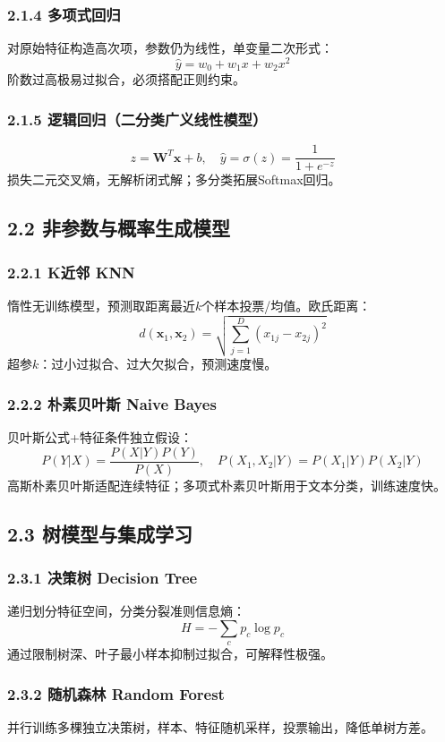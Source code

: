 \documentclass[11pt,a4paper]{article}
\begin{document}
\subsubsection{2.1.4 多项式回归}
对原始特征构造高次项，参数仍为线性，单变量二次形式：
\[
\hat{y}=w_0 + w_1 x + w_2 x^2
\]
阶数过高极易过拟合，必须搭配正则约束。

\subsubsection{2.1.5 逻辑回归（二分类广义线性模型）}
\[
z=\boldsymbol{W}^T \boldsymbol{x}+b,\quad \hat{y}=\sigma(z)=\frac{1}{1+e^{-z}}
\]
损失二元交叉熵，无解析闭式解；多分类拓展Softmax回归。

\subsection{2.2 非参数与概率生成模型}
\subsubsection{2.2.1 K近邻 KNN}
惰性无训练模型，预测取距离最近$k$个样本投票/均值。欧氏距离：
\[
d(\boldsymbol{x}_1,\boldsymbol{x}_2)=\sqrt{\sum_{j=1}^D (x_{1j}-x_{2j})^2}
\]
超参$k$：过小过拟合、过大欠拟合，预测速度慢。

\subsubsection{2.2.2 朴素贝叶斯 Naive Bayes}
贝叶斯公式+特征条件独立假设：
\[
P(Y|X)=\frac{P(X|Y)P(Y)}{P(X)},\quad P(X_1,X_2|Y)=P(X_1|Y)P(X_2|Y)
\]
高斯朴素贝叶斯适配连续特征；多项式朴素贝叶斯用于文本分类，训练速度快。

\subsection{2.3 树模型与集成学习}
\subsubsection{2.3.1 决策树 Decision Tree}
递归划分特征空间，分类分裂准则信息熵：
\[
H=-\sum_c p_c \log p_c
\]
通过限制树深、叶子最小样本抑制过拟合，可解释性极强。

\subsubsection{2.3.2 随机森林 Random Forest}
并行训练多棵独立决策树，样本、特征随机采样，投票输出，降低单树方差。
\end{document}
